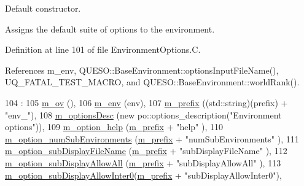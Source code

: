 Default constructor. 

Assigns the default suite of options to the environment. 

Definition at line 101 of file Environment\-Options.\-C.



References m\-\_\-env, Q\-U\-E\-S\-O\-::\-Base\-Environment\-::options\-Input\-File\-Name(), U\-Q\-\_\-\-F\-A\-T\-A\-L\-\_\-\-T\-E\-S\-T\-\_\-\-M\-A\-C\-R\-O, and Q\-U\-E\-S\-O\-::\-Base\-Environment\-::world\-Rank().


\begin{DoxyCode}
104   :
105   \hyperlink{class_q_u_e_s_o_1_1_environment_options_a97de0e8029b2d567643ab2b1b6ba2b9c}{m\_ov}                          (),
106   \hyperlink{class_q_u_e_s_o_1_1_environment_options_afe57e2cd6bb9e71df65fe6d133371478}{m\_env}                         (env),
107   \hyperlink{class_q_u_e_s_o_1_1_environment_options_aca57a4ae24af2c2d1437f6a4d51de6a6}{m\_prefix}                      ((std::string)(prefix) + \textcolor{stringliteral}{"env\_"}),
108   \hyperlink{class_q_u_e_s_o_1_1_environment_options_aa1089e3d1ddc5a9c90fe14c96d668b16}{m\_optionsDesc}                 (\textcolor{keyword}{new} po::options\_description(\textcolor{stringliteral}{"Environment options"})),
109   \hyperlink{class_q_u_e_s_o_1_1_environment_options_a5db2dbd99ef52563cb42c348ee53ea47}{m\_option\_help}                 (\hyperlink{class_q_u_e_s_o_1_1_environment_options_aca57a4ae24af2c2d1437f6a4d51de6a6}{m\_prefix} + \textcolor{stringliteral}{"help"}                 ),
110   \hyperlink{class_q_u_e_s_o_1_1_environment_options_a681529984ebb07b3a2b6684cd3416917}{m\_option\_numSubEnvironments}   (\hyperlink{class_q_u_e_s_o_1_1_environment_options_aca57a4ae24af2c2d1437f6a4d51de6a6}{m\_prefix} + \textcolor{stringliteral}{"numSubEnvironments"}   ),
111   \hyperlink{class_q_u_e_s_o_1_1_environment_options_a500c18cec1f5a1f5d89fec2705ef9106}{m\_option\_subDisplayFileName}   (\hyperlink{class_q_u_e_s_o_1_1_environment_options_aca57a4ae24af2c2d1437f6a4d51de6a6}{m\_prefix} + \textcolor{stringliteral}{"subDisplayFileName"}   ),
112   \hyperlink{class_q_u_e_s_o_1_1_environment_options_a3ebc67b0780a7c5632461154099ea54b}{m\_option\_subDisplayAllowAll}   (\hyperlink{class_q_u_e_s_o_1_1_environment_options_aca57a4ae24af2c2d1437f6a4d51de6a6}{m\_prefix} + \textcolor{stringliteral}{"subDisplayAllowAll"}   ),
113   \hyperlink{class_q_u_e_s_o_1_1_environment_options_acf680dfdb7d9d91d0154a65d973359a8}{m\_option\_subDisplayAllowInter0}(\hyperlink{class_q_u_e_s_o_1_1_environment_options_aca57a4ae24af2c2d1437f6a4d51de6a6}{m\_prefix} + \textcolor{stringliteral}{"subDisplayAllowInter0"}),

\end{DoxyCode}
